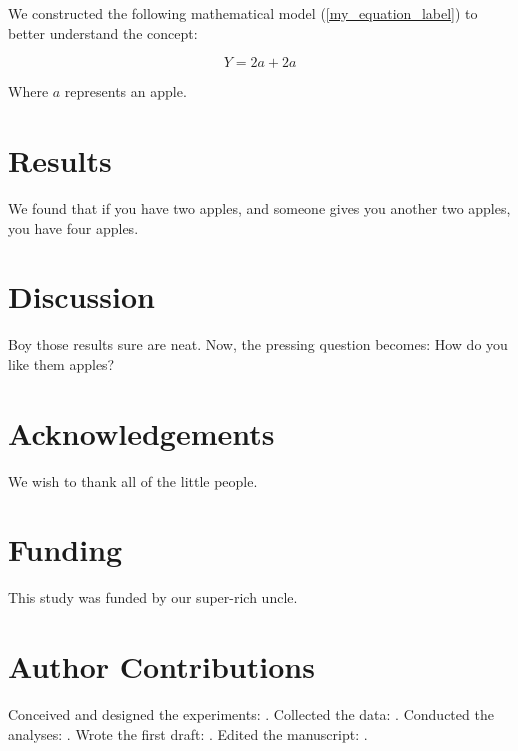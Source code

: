\documentclass[11pt,letterpaper]{article} %
\begin{document}
We constructed the following mathematical model (\ref{my_equation_label}) to better understand the concept:

\begin{equation}\label{my_equation_label}
	Y = 2a + 2a
\end{equation}

Where $a$ represents an apple.

\section*{Results}
We found that if you have two apples, and someone gives you another two apples, you have four apples.

\section*{Discussion}
Boy those results sure are neat. Now, the pressing question becomes: How do you like them apples?

\section*{Acknowledgements}
We wish to thank all of the little people.

\section*{Funding}
This study was funded by our super-rich uncle.

\section*{Author Contributions}
Conceived and designed the experiments: .
Collected the data: .
Conducted the analyses: .
Wrote the first draft: .
Edited the manuscript: .
\end{document}
